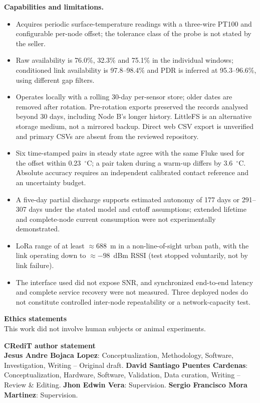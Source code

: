 \documentclass[11pt, letterpaper]{article}
\begin{document}
\textbf{Capabilities and limitations.}
\begin{itemize}[noitemsep]
\item Acquires periodic surface-temperature readings with a three-wire PT100 and configurable per-node offset; the tolerance class of the probe is not stated by the seller.
\item Raw availability is 76.0\%, 32.3\% and 75.1\% in the individual windows; conditioned link availability is 97.8--98.4\% and PDR is inferred at 95.3--96.6\%, using different gap filters.
\item Operates locally with a rolling 30-day per-sensor store; older dates are removed after rotation. Pre-rotation exports preserved the records analysed beyond 30 days, including Node B's longer history. LittleFS is an alternative storage medium, not a mirrored backup. Direct web CSV export is unverified and primary CSVs are absent from the reviewed repository.
\item Six time-stamped pairs in steady state agree with the same Fluke used for the offset within 0.23~$^{\circ}$C; a pair taken during a warm-up differs by 3.6~$^{\circ}$C. Absolute accuracy requires an independent calibrated contact reference and an uncertainty budget.
\item A five-day partial discharge supports estimated autonomy of 177 days or 291--307 days under the stated model and cutoff assumptions; extended lifetime and complete-node current consumption were not experimentally demonstrated.
\item LoRa range of at least $\approx$688~m in a non-line-of-sight urban path, with the link operating down to $\approx-98$~dBm RSSI (test stopped voluntarily, not by link failure).
\item The interface used did not expose SNR, and synchronized end-to-end latency and complete service recovery were not measured. Three deployed nodes do not constitute controlled inter-node repeatability or a network-capacity test.
\end{itemize}

\FloatBarrier

\noindent
\textbf{Ethics statements}\\
This work did not involve human subjects or animal experiments.

\noindent
\textbf{CRediT author statement}\\
\textbf{Jesus Andre Bojaca Lopez}: Conceptualization, Methodology, Software, Investigation, Writing -- Original draft. \textbf{David Santiago Puentes Cardenas}: Conceptualization, Hardware, Software, Validation, Data curation, Writing -- Review \& Editing. \textbf{Jhon Edwin Vera}: Supervision. \textbf{Sergio Francisco Mora Martinez}: Supervision.
\end{document}
